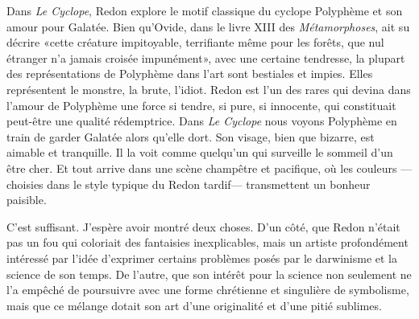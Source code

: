 \documentclass[a4paper, 12pt]{article}
\begin{document}
Dans \textit{Le Cyclope}, Redon explore le motif classique du cyclope Polyphème
et son amour pour Galatée. Bien qu'Ovide, dans le livre XIII des
\textit{Métamorphoses}, ait su décrire «cette créature impitoyable, terrifiante
même pour les forêts, que nul étranger n'a jamais croisée impunément», avec
une certaine tendresse, la plupart des représentations de Polyphème dans l'art
sont bestiales et impies. Elles représentent le monstre, la brute, l'idiot.
Redon est l'un des rares qui devina dans l'amour de Polyphème une force si
tendre, si pure, si innocente, qui constituait peut-être une qualité rédemptrice.
Dans \textit{Le Cyclope} nous voyons Polyphème en train de garder Galatée alors
qu'elle dort. Son visage, bien que bizarre, est aimable et tranquille. Il la
voit comme quelqu'un qui surveille le sommeil d'un être cher. Et tout arrive dans une
scène champêtre et pacifique, où les couleurs ---choisies dans le style typique du
Redon tardif--- transmettent un bonheur paisible.

C'est suffisant. J'espère avoir montré deux choses. D'un côté, que Redon n'était pas
un fou qui coloriait des fantaisies inexplicables, mais un artiste profondément
intéressé par l'idée d'exprimer certains problèmes posés par le darwinisme et la science
de son temps. De l'autre, que son intérêt pour la science non seulement ne l'a
empêché de poursuivre avec une forme chrétienne et singulière de symbolisme, mais
que ce mélange dotait son art d'une originalité et d'une pitié sublimes.
\end{document}
